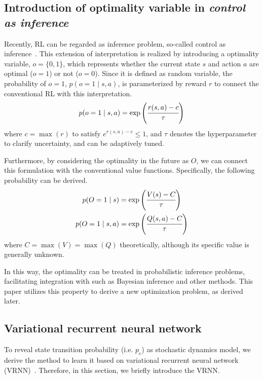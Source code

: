 \documentclass{bmcart}
\begin{document}
\subsection{Introduction of optimality variable in \textit{control as inference}}

Recently, RL can be regarded as inference problem, so-called control as inference~\cite{levine2018reinforcement}.
This extension of interpretation is realized by introducing a optimality variable, $o = \{0, 1\}$, which represents whether the current state $s$ and action $a$ are optimal ($o = 1$) or not ($o = 0$).
Since it is defined as random variable, the probability of $o = 1$, $p(o=1 \mid s, a)$, is parameterized by reward $r$ to connect the conventional RL with this interpretation.
\begin{align}
    p(o = 1 \mid s, a) = \exp\left( \cfrac{r(s, a) - c}{\tau} \right)
    \label{eq:def_opt_r}
\end{align}
where $c = \max(r)$ to satisfy $e^{r(s, a) - c} \leq 1$, and $\tau$ denotes the hyperparameter to clarify uncertainty, and can be adaptively tuned.

Furthermore, by considering the optimality in the future as $O$, we can connect this formulation with the conventional value functions.
Specifically, the following probability can be derived.
\begin{align}
    p(O = 1 \mid s) &= \exp\left( \cfrac{V(s) - C}{\tau} \right)
    \label{eq:def_opt_V} \\
    p(O = 1 \mid s, a) &= \exp\left( \cfrac{Q(s, a) - C}{\tau} \right)
    \label{eq:def_opt_Q}
\end{align}
where $C = \max(V) = \max(Q)$ theoretically, although its specific value is generally unknown.

In this way, the optimality can be treated in probabilistic inference problems, facilitating integration with such as Bayesian inference and other methods.
This paper utilizes this property to derive a new optimization problem, as derived later.

\subsection{Variational recurrent neural network}

To reveal state transition probability (i.e. $p_e$) as stochastic dynamics model, we derive the method to learn it based on variational recurrent neural network (VRNN)~\cite{chung2015recurrent}.
Therefore, in this section, we briefly introduce the VRNN.
\end{document}
